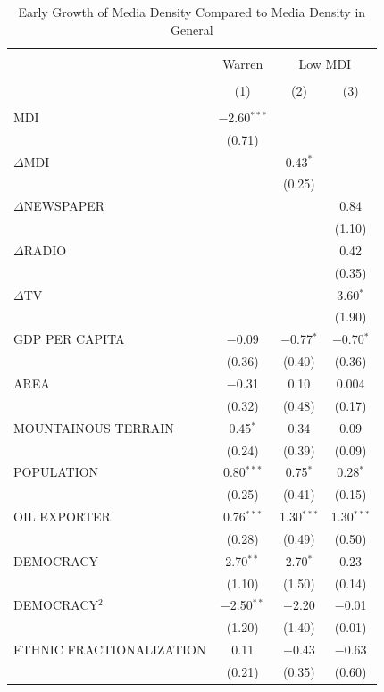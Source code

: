 \documentclass[11pt,article,oneside]{memoir}
\begin{document}
\begin{table}[!htbp] \centering 
  \caption{Early Growth of Media Density Compared to Media Density in General} 
  \label{} 
\footnotesize 
\begin{tabular}{@{\extracolsep{5pt}}lccc} 
\\[-1.8ex]\hline \\[-1.8ex] 
 & Warren & \multicolumn{2}{c}{Low MDI} \\ 
\\[-1.8ex] & (1) & (2) & (3)\\ 
\hline \\[-1.8ex] 
 MDI & $-$2.60$^{***}$ &  &  \\ 
  & (0.71) &  &  \\ 
  $\Delta$MDI &  & 0.43$^{*}$ &  \\ 
  &  & (0.25) &  \\ 
  $\Delta$NEWSPAPER &  &  & 0.84 \\ 
  &  &  & (1.10) \\ 
  $\Delta$RADIO &  &  & 0.42 \\ 
  &  &  & (0.35) \\ 
  $\Delta$TV &  &  & 3.60$^{*}$ \\ 
  &  &  & (1.90) \\ 
  GDP PER CAPITA & $-$0.09 & $-$0.77$^{*}$ & $-$0.70$^{*}$ \\ 
  & (0.36) & (0.40) & (0.36) \\ 
  AREA & $-$0.31 & 0.10 & 0.004 \\ 
  & (0.32) & (0.48) & (0.17) \\ 
  MOUNTAINOUS TERRAIN & 0.45$^{*}$ & 0.34 & 0.09 \\ 
  & (0.24) & (0.39) & (0.09) \\ 
  POPULATION & 0.80$^{***}$ & 0.75$^{*}$ & 0.28$^{*}$ \\ 
  & (0.25) & (0.41) & (0.15) \\ 
  OIL EXPORTER & 0.76$^{***}$ & 1.30$^{***}$ & 1.30$^{***}$ \\ 
  & (0.28) & (0.49) & (0.50) \\ 
  DEMOCRACY & 2.70$^{**}$ & 2.70$^{*}$ & 0.23 \\ 
  & (1.10) & (1.50) & (0.14) \\ 
  DEMOCRACY$^2$ & $-$2.50$^{**}$ & $-$2.20 & $-$0.01 \\ 
  & (1.20) & (1.40) & (0.01) \\ 
  ETHNIC FRACTIONALIZATION & 0.11 & $-$0.43 & $-$0.63 \\ 
  & (0.21) & (0.35) & (0.60) \\ 

\end{tabular}
\end{table}
\end{document}
